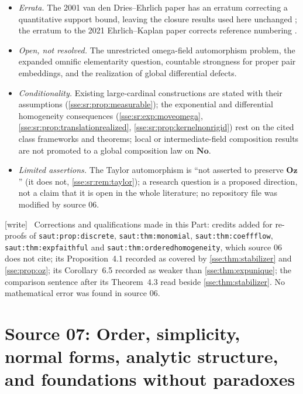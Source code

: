 \documentclass[11pt,a4paper]{article}
\numberwithin{equation}{section}
\theoremstyle{plain}
\theoremstyle{definition}
\theoremstyle{remark}
\newcommand{\No}{\mathbf{No}}
\newcommand{\Oz}{\mathbf{Oz}}
\newcommand{\lbl}[1]{\nolinkurl{#1}}%
\newcommand{\wtag}{\textup{\textsf{[write]}}}%
\newenvironment{wnote}{\par\smallskip\noindent\wtag\ }{\par\smallskip}
\begin{document}
\begin{itemize}
\cite{KKS} fails. (Not checked for this report; compare the sign remarks of
source 07.)
\item \emph{Errata.} The 2001 van den Dries--Ehrlich paper has an erratum
correcting a quantitative support bound, leaving the closure results used here
unchanged \cite{vdDE}; the erratum to the 2021 Ehrlich--Kaplan paper corrects
reference numbering \cite{EhrlichKaplan}.
\item \emph{Open, not resolved.} The unrestricted omega-field automorphism problem,
the expanded omnific elementarity question, countable strongness for proper pair
embeddings, and the realization of global differential defects.
\item \emph{Conditionality.} Existing large-cardinal constructions are stated with
their assumptions (\cref{sse:sr:prop:measurable}); the exponential and
differential homogeneity consequences (\cref{sse:sr:exp:moveomega},
\cref{sse:sr:prop:translationrealized}, \cref{sse:sr:prop:kernelnonrigid}) rest on
the cited class frameworks and theorems; local or intermediate-field composition
results are not promoted to a global composition law on $\No$.
\item \emph{Limited assertions.} The Taylor automorphism is ``not asserted to
preserve $\Oz$'' (it does not, \cref{sse:sr:rem:taylor}); a research question is a
proposed direction, not a claim that it is open in the whole literature; no
repository file was modified by source 06.
\end{itemize}

\begin{wnote}
Corrections and qualifications made in this Part: credits added for re-proofs
of \lbl{saut:prop:discrete}, \lbl{saut:thm:monomial}, \lbl{saut:thm:coeffflow},
\lbl{saut:thm:expfaithful} and \lbl{saut:thm:orderedhomogeneity}, which source 06
does not cite; its Proposition~4.1 recorded as covered by \cref{sse:thm:stabilizer}
and \cref{sse:prop:oz}; its Corollary~6.5 recorded as weaker than
\cref{sse:thm:expunique}; the comparison sentence after its Theorem~4.3 read
beside \cref{sse:thm:stabilizer}. No mathematical error was found in source 06.
\end{wnote}
\part{Source 07: Order, simplicity, normal forms, analytic structure, and foundations without paradoxes}\label{sse:part:an}
\end{document}
